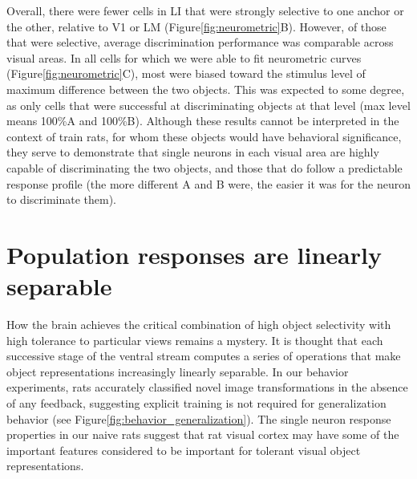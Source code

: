 Overall, there were fewer cells in LI that were strongly selective to one anchor or the other, relative to V1 or LM (Figure\ref{fig:neurometric}B). However, of those that were selective, average discrimination performance was comparable across visual areas. In all cells for which we were able to fit neurometric curves (Figure\ref{fig:neurometric}C), most were biased toward the stimulus level of maximum difference between the two objects. This was expected to some degree, as only cells that were successful at discriminating objects at that level (max level means 100\%A and 100\%B). Although these results cannot be interpreted in the context of train rats, for whom these objects would have behavioral significance, they serve to demonstrate that single neurons in each visual area are highly capable of discriminating the two objects, and those that do follow a predictable response profile (the more different A and B were, the easier it was for the neuron to discriminate them).  


\section{Population responses are linearly separable}
How the brain achieves the critical combination of high object selectivity with high tolerance to particular views remains a mystery. It is thought that each successive stage of the ventral stream computes a series of operations that make object representations increasingly linearly separable. In our behavior experiments, rats accurately classified novel image transformations in the absence of any feedback, suggesting explicit training is not required for generalization behavior (see Figure\ref{fig:behavior_generalization}). The single neuron response properties in our naive rats suggest that rat visual cortex may have some of the important features considered to be important for tolerant visual object representations.


